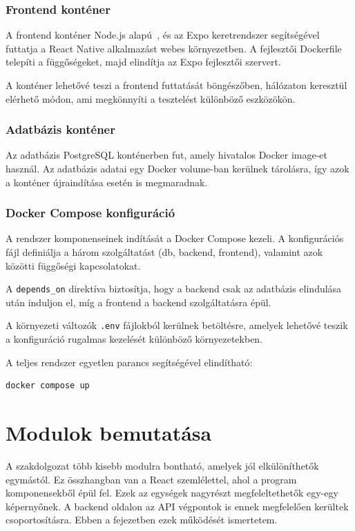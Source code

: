 \documentclass[
]{thesis-ekf}
\theoremstyle{definition}
\theoremstyle{remark}
\begin{document}
\subsubsection{Frontend konténer}

A frontend konténer Node.js alapú~\cite{nodejs}, és az Expo keretrendszer segítségével futtatja a React Native alkalmazást webes környezetben. A fejlesztői Dockerfile telepíti a függőségeket, majd elindítja az Expo fejlesztői szervert.

A konténer lehetővé teszi a frontend futtatását böngészőben, hálózaton keresztül elérhető módon, ami megkönnyíti a tesztelést különböző eszközökön.

\subsubsection{Adatbázis konténer}

Az adatbázis PostgreSQL konténerben fut, amely hivatalos Docker image-et használ. Az adatbázis adatai egy Docker volume-ban kerülnek tárolásra, így azok a konténer újraindítása esetén is megmaradnak.

\subsubsection{Docker Compose konfiguráció}

A rendszer komponenseinek indítását a Docker Compose kezeli. A konfigurációs fájl definiálja a három szolgáltatást (db, backend, frontend), valamint azok közötti függőségi kapcsolatokat.

A \texttt{depends\_on} direktíva biztosítja, hogy a backend csak az adatbázis elindulása után induljon el, míg a frontend a backend szolgáltatásra épül.

A környezeti változók \texttt{.env} fájlokból kerülnek betöltésre, amelyek lehetővé teszik a konfiguráció rugalmas kezelését különböző környezetekben.

A teljes rendszer egyetlen parancs segítségével elindítható:
\begin{verbatim}
docker compose up
\end{verbatim}

\section{Modulok bemutatása}
\label{sec_modules}

A szakdolgozat több kisebb modulra bontható, amelyek jól elkülöníthetők egymástól. Ez összhangban van a React szemlélettel, ahol a program komponensekből épül fel. Ezek az egységek nagyrészt megfeleltethetők egy-egy képernyőnek. A backend oldalon az API végpontok is ennek megfelelően kerültek csoportosításra. Ebben a fejezetben ezek működését ismertetem.
\end{document}

